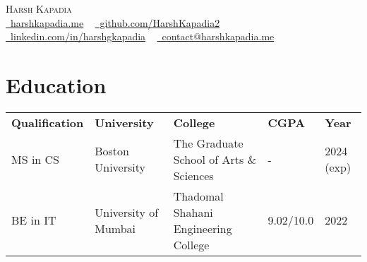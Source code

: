 \documentclass[letterpaper,11pt]{article}
\begin{document}

\begin{center}
    {\huge \scshape Harsh Kapadia} \\ \vspace{1pt}
    \small
    \faGlobe \href{https://harshkapadia.me}{\raisebox{-0.1\height}\ harshkapadia.me} ~
    \faGithub \href{https://github.com/HarshKapadia2}{\raisebox{-0.2\height}\ github.com/HarshKapadia2} ~
    \faLinkedin \href{https://linkedin.com/in/harshgkapadia}{\raisebox{-0.2\height}\ linkedin.com/in/harshgkapadia} ~
    \faEnvelope \href{mailto:contact@harshkapadia.me}{\raisebox{-0.2\height}\  contact@harshkapadia.me}
    \vspace{-13pt}
\end{center}


\section{Education}
    \vspace{-4pt}
    \begin{itemize}[leftmargin=0.2in, label={}]
        {\item{
            \begin{tabular}{ l@{\hskip 0.2in} l@{\hskip 0.2in} l@{\hskip 0.2in} l@{\hskip 0.2in} l }
                 \textbf{Qualification} & \textbf{University} & \textbf{College} & \textbf{CGPA} & \textbf{Year} \\ 
                 MS in CS & Boston University & The Graduate School of Arts \& Sciences & - & 2024 (exp) \\
                 BE in IT & University of Mumbai & Thadomal Shahani Engineering College & 9.02/10.0 & 2022
            \end{tabular}
        }}
    \end{itemize}
\vspace{-20pt}


\end{document}
